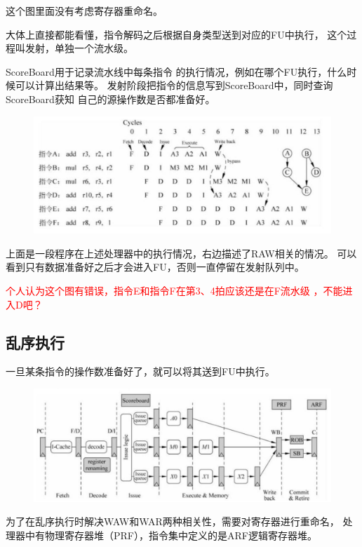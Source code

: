 \documentclass{article}
\begin{document}
  这个图里面没有考虑寄存器重命名。

  大体上直接都能看懂，指令解码之后根据自身类型送到对应的FU中执行，
  这个过程叫发射，单独一个流水级。
  
  ScoreBoard用于记录流水线中每条指令
  的执行情况，例如在哪个FU执行，什么时候可以计算出结果等。
  发射阶段把指令的信息写到ScoreBoard中，同时查询ScoreBoard获知
  自己的源操作数是否都准备好。


  \begin{figure}[H]
    \centering
    \includegraphics[width=13cm]{./figures/chap1_prog.jpg}
  \end{figure}

  
  上面是一段程序在上述处理器中的执行情况，右边描述了RAW相关的情况。
  可以看到只有数据准备好之后才会进入FU，否则一直停留在发射队列中。

  \textcolor{red}{个人认为这个图有错误，指令E和指令F在第3、4拍应该还是在F流水级
  ，不能进入D吧？}

  \subsection{乱序执行}

  一旦某条指令的操作数准备好了，就可以将其送到FU中执行。
  \begin{figure}[H]
    \centering
    \includegraphics*[width=14cm]{./figures/chap1_oor.jpg}
  \end{figure}

  为了在乱序执行时解决WAW和WAR两种相关性，需要对寄存器进行重命名，
  处理器中有物理寄存器堆（PRF），指令集中定义的是ARF逻辑寄存器堆。
  
\end{document}
